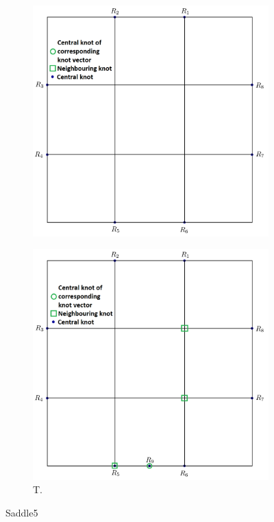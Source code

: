 \documentclass{article}
\begin{document}
\begin{figure}[H]
\centering
\begin{subfigure}[b]{0.48\textwidth}
\includegraphics[width=\textwidth]{saddle5aparam}
\caption{}
\label{saddle5ap}
\end{subfigure}
\begin{subfigure}[b]{0.48\textwidth}
\includegraphics[width=\textwidth]{saddle5bparam}
\caption{T.}
\label{saddle5bp}
\end{subfigure}
\caption{Saddle5}
\label{saddle5p}
\end{figure}
\end{document}
